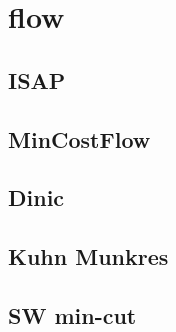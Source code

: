 \documentclass[a4paper,10pt,twocolumn,oneside]{article}
\begin{document}
\section{flow}

\subsection{ISAP}


%

\subsection{MinCostFlow}


\subsection{Dinic}


%

%

%

\subsection{Kuhn Munkres}


%

\subsection{SW min-cut}

\end{document}
